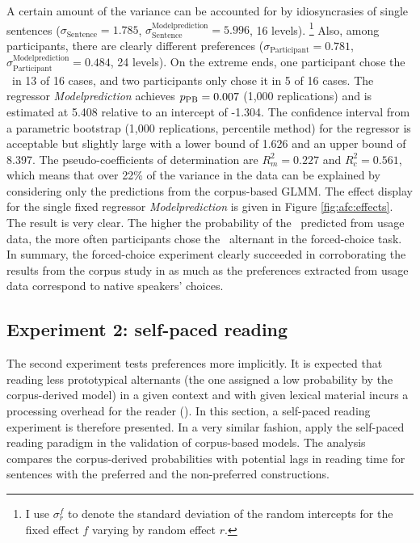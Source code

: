 A certain amount of the variance can be accounted for by idiosyncrasies of single sentences ($\sigma_{\text{Sentence}}=1.785$, $\sigma^{\text{Modelprediction}}_{\text{Sentence}}=5.996$, 16 levels).%
\footnote{I use $\sigma^f_r$ to denote the standard deviation of the random intercepts for the fixed effect $f$ varying by random effect $r$.}
Also, among participants, there are clearly different preferences ($\sigma_{\text{Participant}}=0.781$, $\sigma^{\text{Modelprediction}}_{\text{Participant}}=0.484$, 24 levels).
On the extreme ends, one participant chose the \PGCa\ in 13 of 16 cases, and two participants only chose it in 5 of 16 cases.
The regressor \textit{Modelprediction} achieves $p_{\text{PB}}=0.007$ (1,000 replications) and is estimated at 5.408 relative to an intercept of -1.304.
The confidence interval from a parametric bootstrap (1,000 replications, percentile method) for the regressor is acceptable but slightly large with a lower bound of 1.626 and an upper bound of 8.397.
The pseudo-coefficients of determination are $R^2_{m}=0.227$ and $R^2_{c}=0.561$, which means that over 22\% of the variance in the data can be explained by considering only the predictions from the corpus-based GLMM.
The effect display for the single fixed regressor \textit{Modelprediction} is given in Figure \ref{fig:afc:effects}.
The result is very clear.
The higher the probability of the \PGCa\ predicted from usage data, the more often participants chose the \PGCa\ alternant in the forced-choice task.
In summary, the forced-choice experiment clearly succeeded in corroborating the results from the corpus study in as much as the preferences extracted from usage data correspond to native speakers' choices.



\subsection{Experiment 2: self-paced reading}
\label{sec:exp:spr}

The second experiment tests preferences more implicitly.
It is expected that reading less prototypical alternants (the one assigned a low probability by the corpus-derived model) in a given context and with given lexical material incurs a processing overhead for the reader (\citealp{Kaiser2013}).
In this section, a self-paced reading experiment is therefore presented.
In a very similar fashion, \cite{DivjakEa2016} apply the self-paced reading paradigm in the validation of corpus-based models.
The analysis compares the corpus-derived probabilities with potential lags in reading time for sentences with the preferred and the non-preferred constructions.

